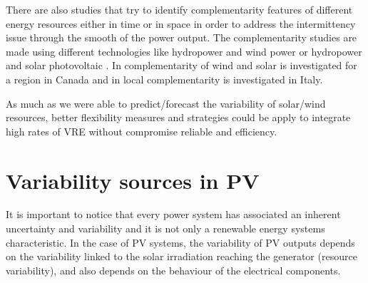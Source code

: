 
There are also studies that try to identify complementarity features of different energy resources either in time or in space in order to address the intermittency issue through the smooth of the power output. The complementarity studies are made using different technologies like hydropower and wind power \cite*{Denault2009, Silva2016} or hydropower and solar photovoltaic \cite*{Francois2016, Beluco2012, Kougias2016}. In \cite*{Hoicka2011} complementarity of wind and solar is investigated for a region in Canada and in \cite*{Monforti2014} local complementarity is investigated in Italy.


As much as we were able to predict/forecast the variability of solar/wind resources, better flexibility measures and strategies could be apply to integrate high rates of VRE without compromise reliable and efficiency. 
\section{Variability sources in PV}

It is important to notice that every power system has associated an inherent uncertainty and variability and it is not only a renewable energy systems characteristic. In the case of PV systems, the variability of PV outputs depends on the variability linked to the solar irradiation reaching the generator (resource variability), and also depends on the behaviour of the electrical components.  


